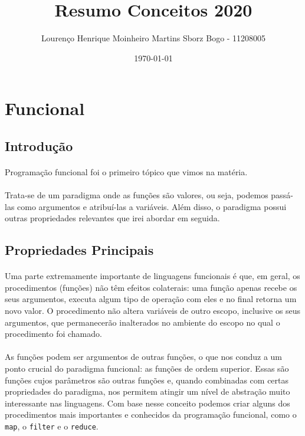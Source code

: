 \documentclass[11pt]{article}
\author{Lourenço Henrique Moinheiro Martins Sborz Bogo - 11208005}
\date{\today}
\title{Resumo Conceitos 2020}
\begin{document}
\maketitle
\tableofcontents

\newpage
\section{Funcional}
\label{sec:orgfe613b7}
\subsection{Introdução}
\label{sec:org9f7801e}

\paragraph{} Programação funcional foi o primeiro tópico que vimos na matéria.
\paragraph{} Trata-se de um paradigma onde as funções são valores, ou seja, podemos passá-las como argumentos e
atribuí-las a variáveis. Além disso, o paradigma possui outras propriedades relevantes que irei abordar em seguida.

\subsection{Propriedades Principais}
\label{sec:orga89e575}
\paragraph{} Uma parte extremamente importante de linguagens funcionais é que, em geral, os procedimentos (funções) não têm efeitos colaterais:
uma função apenas recebe os seus argumentos, executa algum tipo de operação com eles e no final retorna um novo valor.
O procedimento não altera variáveis de outro escopo, inclusive os seus argumentos, que permanecerão inalterados no ambiente do escopo no
qual o procedimento foi chamado.

\paragraph{} As funções podem ser argumentos de outras funções, o que nos conduz a um ponto crucial do paradigma funcional:
as funções de ordem superior. Essas são funções cujos parâmetros são outras funções e, quando combinadas com certas
propriedades do paradigma, nos permitem atingir um nível de abstração muito interessante nas linguagens. Com base nesse conceito
podemos criar alguns dos procedimentos mais importantes e conhecidos da programação funcional, como o \texttt{map}, o \texttt{filter} e o \texttt{reduce}.
\end{document}
